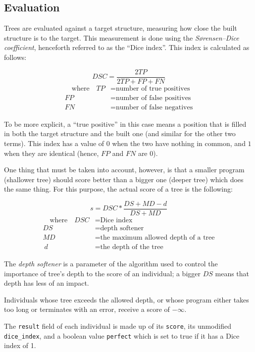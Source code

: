 \documentclass{report}
\begin{document}
\subsection{Evaluation}

Trees are evaluated against a target structure, measuring how close the built structure is to the target. This measurement is done using the \emph{Sørensen–Dice coefficient}\cite{sorensen}\cite{dice}, henceforth referred to as the ``Dice index''. This index is calculated as follows:

$$DSC = \frac{2TP}{2TP + FP + FN}$$
\begin{align*}\quad
    \text{where}\quad
    TP &= \text{number of true positives}\\
    FP &= \text{number of false positives}\\
    FN &= \text{number of false negatives}
\end{align*}

To be more explicit, a ``true positive'' in this case means a position that is filled in both the target structure and the built one (and similar for the other two terms). This index has a value of $0$ when the two have nothing in common, and $1$ when they are identical (hence, $FP$ and $FN$ are $0$).

One thing that must be taken into account, however, is that a smaller program (shallower tree) should score better than a bigger one (deeper tree) which does the same thing. For this purpose, the actual score of a tree is the following:

$$s = DSC * \frac{DS + MD - d}{DS + MD}$$
\begin{align*}\quad
    \text{where}\quad
    DSC &= \text{Dice index}\\
    DS &= \text{depth softener}\\
    MD &= \text{the maximum allowed depth of a tree}\\\
    d &= \text{the depth of the tree}
\end{align*}

\label{depth_softener}

The \emph{depth softener} is a parameter of the algorithm  used to control the importance of tree's depth to the score of an individual; a bigger $DS$ means that depth has less of an impact.

Individuals whose tree exceeds the allowed depth, or whose program either takes too long or terminates with an error, receive a score of $-\infty$.

The \verb|result| field of each individual is made up of its \verb|score|, its unmodified \verb|dice_index|, and a boolean value \verb|perfect| which is set to true if it has a Dice index of 1.
\end{document}
